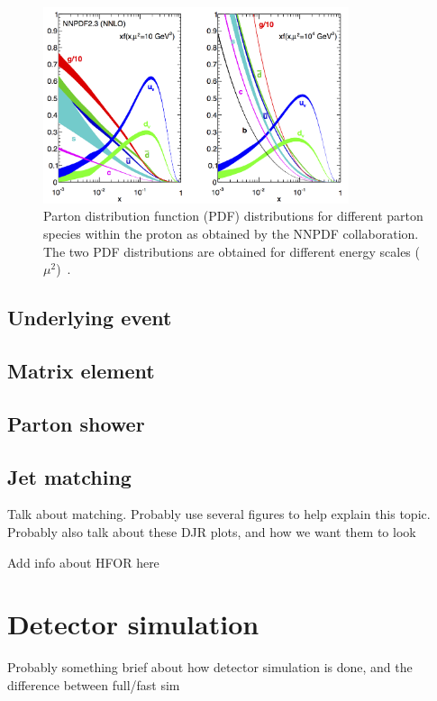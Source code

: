 \begin{figure}
  \centering
  \includegraphics[width=0.80\textwidth]{figs/mc_gen/pdfs.png}
  \caption{Parton distribution function (PDF) distributions for different
    parton species within the proton as obtained by the NNPDF collaboration.
    The two PDF distributions are obtained for different energy
    scales ($\mu^2$)~\cite{nnpdf}.
  }
  \label{fig:pdfs}
\end{figure}


\FloatBarrier
\subsection{Underlying event}
\label{sec:underlying_event}

\FloatBarrier
\subsection{Matrix element}
\label{sec:matrix_element}

\FloatBarrier
\subsection{Parton shower}
\label{sec:parton_shower}

\FloatBarrier
\subsection{Jet matching}
\label{sec:jet_matching}

{\color{red} Talk about matching. Probably use several figures to help explain
  this topic. Probably also talk about these DJR plots, and how we want them
  to look}

{\color{red} Add info about HFOR here}

\FloatBarrier
\section{Detector simulation}
\label{sec:det_sim}

{\color{red} Probably something brief about how detector simulation is done, and
  the difference between full/fast sim}

